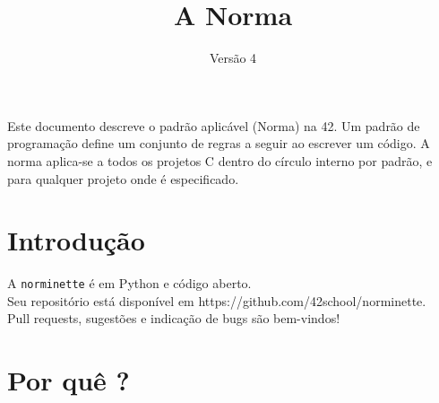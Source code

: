 \documentclass{42-pt}
\begin{document}
\title{A Norma}
\subtitle{Versão 4}

\summary
{
    Este documento descreve o padrão aplicável (Norma) na 42. Um padrão de
	programação define um conjunto de regras a seguir ao escrever um código.
    A norma aplica-se a todos os projetos C dentro do círculo interno por padrão, e
    para qualquer projeto onde é especificado.
}

\maketitle

\tableofcontents



\chapter{Introdução}

    A \texttt{norminette} é em Python e código aberto.\\
    Seu repositório está disponível em https://github.com/42school/norminette. \\
    Pull requests, sugestões e indicação de bugs são bem-vindos!


    \chapter{Por quê ?}
\end{document}
